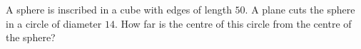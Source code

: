 A sphere is inscribed in a cube with edges of length $50$. A plane cuts the sphere in a circle of diameter $14$. How far is the centre of this circle from the centre of the sphere?
